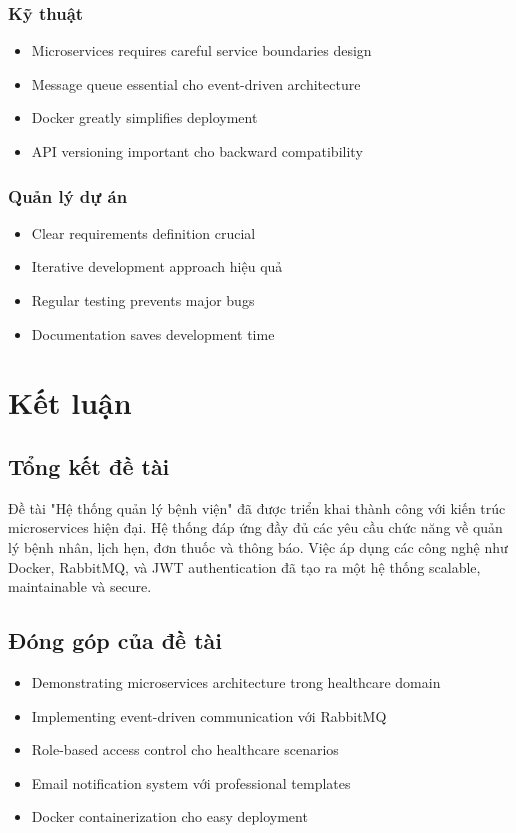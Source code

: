 \documentclass[12pt,a4paper]{report}
\begin{document}
    \subsection{Kỹ thuật}
    \begin{itemize}
        \item Microservices requires careful service boundaries design
        \item Message queue essential cho event-driven architecture
        \item Docker greatly simplifies deployment
        \item API versioning important cho backward compatibility
    \end{itemize}

    \subsection{Quản lý dự án}
    \begin{itemize}
        \item Clear requirements definition crucial
        \item Iterative development approach hiệu quả
        \item Regular testing prevents major bugs
        \item Documentation saves development time
    \end{itemize}

    \chapter{Kết luận}

    \section{Tổng kết đề tài}
    Đề tài "Hệ thống quản lý bệnh viện" đã được triển khai thành công với kiến trúc microservices hiện đại. Hệ thống đáp ứng đầy đủ các yêu cầu chức năng về quản lý bệnh nhân, lịch hẹn, đơn thuốc và thông báo. Việc áp dụng các công nghệ như Docker, RabbitMQ, và JWT authentication đã tạo ra một hệ thống scalable, maintainable và secure.

    \section{Đóng góp của đề tài}
    \begin{itemize}
        \item Demonstrating microservices architecture trong healthcare domain
        \item Implementing event-driven communication với RabbitMQ
        \item Role-based access control cho healthcare scenarios
        \item Email notification system với professional templates
        \item Docker containerization cho easy deployment
    \end{itemize}
\end{document}
